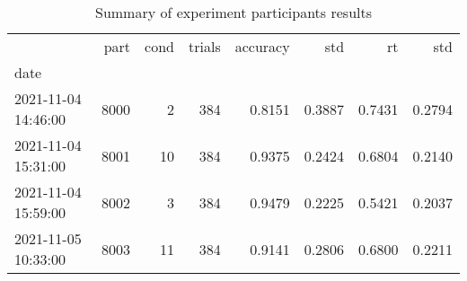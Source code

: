 \begin{table}
\centering
\caption{Summary of experiment participants results}
\label{table-subject-summary}
\begin{tabular}{lrrrrrrr}
\toprule
{} &  part & cond & trials & accuracy &    std &     rt &    std \\
date                &       &      &        &          &        &        &        \\
\midrule
2021-11-04 14:46:00 &  8000 &    2 &    384 &   0.8151 & 0.3887 & 0.7431 & 0.2794 \\
2021-11-04 15:31:00 &  8001 &   10 &    384 &   0.9375 & 0.2424 & 0.6804 & 0.2140 \\
2021-11-04 15:59:00 &  8002 &    3 &    384 &   0.9479 & 0.2225 & 0.5421 & 0.2037 \\
2021-11-05 10:33:00 &  8003 &   11 &    384 &   0.9141 & 0.2806 & 0.6800 & 0.2211 \\
\bottomrule
\end{tabular}
\end{table}
